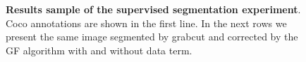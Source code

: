 \documentclass[smallextended]{svjour3}
\begin{document}
\begin{figure}
\caption{\textbf{Results sample of the supervised segmentation experiment}. Coco annotations are shown in the first line. In the next rows we present the same image segmented by grabcut and corrected by the GF algorithm with and without data term.  }
\label{fig:coco-experiment-sample}
\end{figure}
\end{document}

